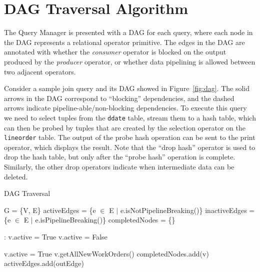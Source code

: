 \section{DAG Traversal Algorithm}\label{apx:DAG-algo}
The Query Manager is presented with a DAG for each query, where each
node in the DAG represents a relational operator primitive.
The edges in the DAG are annotated with whether the 
\textit{consumer} operator is blocked on the output produced 
by the \textit{producer} operator, or whether data pipelining is
allowed between two adjacent operators. 

Consider a sample join query and its DAG showed in Figure~\ref{fig:dag}.
The solid arrows in the DAG correspond to ``blocking'' dependencies,
and the dashed arrows indicate pipeline-able/non-blocking dependencies. 
To execute this query we need to select tuples from the \verb+ddate+ 
table, stream them to a hash table, which can then be probed by tuples that are 
created by the selection operator on the \verb+lineorder+ table. %
The output of the probe hash operation can be sent to the print operator, which
displays the result. %
Note that the ``drop hash'' operator is used to drop the hash table, but only 
after the ``probe hash'' operation is complete. 
Similarly, the other drop operators indicate when intermediate data can be deleted. 

\begin{algorithm}
	\caption{DAG Traversal}
	\begin{algorithmic}[1]
		\State G = \{V, E\}
		\State activeEdges = \{e $\in$ E $|$ e.isNotPipelineBreaking()\}
		\label{alg:pipelining}
		\State inactiveEdges = \{e $\in$ E $|$ e.isPipelineBreaking()\}
		\State completedNodes = \{\}
		
		:
				\State v.active = True
			\Else
				\State v.active = False
			\EndIf
		\EndFor
		
			\State v.active = True \label{alg:depMet}
		\EndIf
		\State v.getAllNewWorkOrders() \label{alg:getWork}
		 \label{alg:finishGenWork}
		\State completedNodes.add(v) \label{alg:nodeComplete}
		\State activeEdges.add(outEdge)\label{alg:outEdgesActive}
		\EndFor
		\EndIf
		\EndIf
		\EndFor	
		\EndWhile
	\end{algorithmic}
	\label{alg:dag-traversal}
\end{algorithm}

